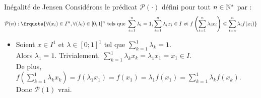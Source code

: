 \documentclass{article}
\renewenvironment{question_kholle}[2][ ]
{
	\subsection{\texorpdfstring{#2}{}}
	\notblank{#1}
	{
		\noindent #1
		\bigbreak
	}
	{}
	\begin{proof}
}
{
	\end{proof}
}
\begin{document}
\begin{question_kholle}
	[{Soit $f : I \longrightarrow \R$ convexe sur $I$. Alors, pour tout $n\in\N^{*}$, pour tous $(x_{1},\dots,x_{n})\in I^{n}$ et tous $(\lambda_{1}, \dots, \lambda_{n})\in[0,1]^{n}$ tels que $\sum_{i=1}^{n}\lambda_{i}=1$,
	\begin{equation}
		\sum_{k=1}^{n} \lambda_k x_k \in I \quad\text{et}\quad
		f\left( \sum_{k=1}^{n} \lambda_k x_k \right)
		\leqslant \sum_{k=1}^{n} \lambda_k f\left( x_k \right)
	\end{equation}}]
	{Inégalité de Jensen}
	Considérons le prédicat $\mathcal{P}(\cdot)$ défini pour tout $n \in \mathbb N^*$ par :
	\begin{equation*}
		\mathcal{P}(n):\frquote{\displaystyle\forall(x_{i})\in I^{n}, \forall (\lambda_{i})\in[0,1]^{n} \text{ tels que } \sum_{i=1}^{n}\lambda_{i}=1, \sum_{i=1}^{n}\lambda_{i}x_{i}\in I \text{ et } f \left(\sum_{i=1}^{n}\lambda_{i}x_{i}\right)\leq \sum_{i=a}^{n}\lambda_{i}f(x_{i})}
	\end{equation*}

	\begin{itemize}[label=$*$, leftmargin=0.5cm]
		\item Soient $x \in I^1$ et $\lambda \in [0;1]^1$ tel que $\sum_{k=1}^{1} \lambda_k = 1$. \\
		      Alors $\lambda_1 = 1$. Trivialement, $\sum_{k=1}^{1} \lambda_k x_k = \lambda_1 x_1 = x_1 \in I$. \\
		      De plus, $f\left( \sum_{k=1}^{1} \lambda_k x_k \right)
			      = f\left( \lambda_1 x_1 \right)
			      = f\left( x_1 \right)
			      = \lambda_1 f\left( x_1 \right)
			      = \sum_{k=1}^{1} \lambda_k f\left( x_k \right)$. \\
		      Donc $\mathcal{P}(1)$ vrai.


\end{itemize}
\end{question_kholle}
\end{document}
